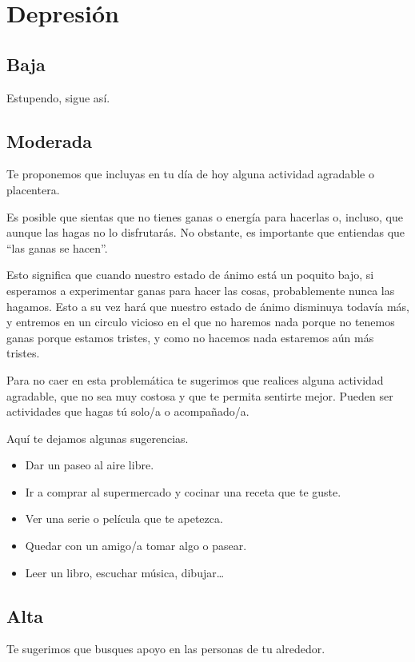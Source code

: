    \section{Depresión}
        \subsection{Baja}
            Estupendo, sigue así. 
        \subsection{Moderada}

            Te proponemos que incluyas en tu  día de hoy alguna actividad agradable o placentera. 
            
            Es posible que sientas que no tienes ganas o energía para hacerlas o, incluso, que aunque las hagas no lo 
            disfrutarás. No obstante, es importante que entiendas que “las ganas se hacen”. 
            
            Esto significa que cuando nuestro estado de ánimo está un poquito bajo, si esperamos a experimentar 
            ganas para hacer las cosas, probablemente nunca las hagamos. Esto a su vez hará que nuestro estado de 
            ánimo disminuya todavía más, y entremos en un circulo vicioso en el que no haremos nada porque no 
            tenemos ganas porque estamos tristes, y como no hacemos nada estaremos aún más tristes. 
            
            Para no caer en esta problemática te sugerimos que realices alguna actividad agradable, que no sea muy 
            costosa y que te permita sentirte mejor. Pueden ser actividades que hagas tú solo/a o acompañado/a. 
            
            Aquí te dejamos algunas sugerencias. 
            \begin{itemize}
                \item Dar un paseo al aire libre. 
                \item Ir a comprar al supermercado y cocinar una receta que te guste. 
                \item Ver una serie o película que te apetezca.
                \item Quedar con un amigo/a tomar algo o pasear.
                \item Leer un libro, escuchar música, dibujar… 
            \end{itemize}

        \subsection{Alta}
            Te sugerimos que busques apoyo en las personas de tu alrededor.

